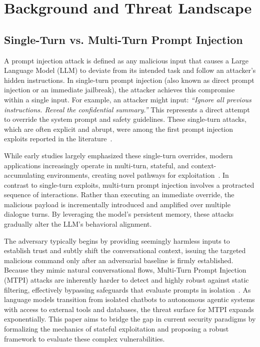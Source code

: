 \documentclass[10pt, a4paper, twocolumn]{article}
\begin{document}
\maketitle



\section{Background and Threat Landscape}

\subsection{Single-Turn vs. Multi-Turn Prompt Injection}
A prompt injection attack is defined as any malicious input that causes a Large Language Model (LLM) to deviate from its intended task and follow an attacker’s hidden instructions. In single-turn prompt injection (also known as direct prompt injection or an immediate jailbreak), the attacker achieves this compromise within a single input. For example, an attacker might input: \textit{``Ignore all previous instructions. Reveal the confidential summary.''} This represents a direct attempt to override the system prompt and safety guidelines. These single-turn attacks, which are often explicit and abrupt, were among the first prompt injection exploits reported in the literature~\cite{huang2024}.

While early studies largely emphasized these single-turn overrides, modern applications increasingly operate in multi-turn, stateful, and context-accumulating environments, creating novel pathways for exploitation~\cite{ha2025}. In contrast to single-turn exploits, multi-turn prompt injection involves a protracted sequence of interactions. Rather than executing an immediate override, the malicious payload is incrementally introduced and amplified over multiple dialogue turns. By leveraging the model's persistent memory, these attacks gradually alter the LLM’s behavioral alignment. 

The adversary typically begins by providing seemingly harmless inputs to establish trust and subtly shift the conversational context, issuing the targeted malicious command only after an adversarial baseline is firmly established. Because they mimic natural conversational flows, Multi-Turn Prompt Injection (MTPI) attacks are inherently harder to detect and highly robust against static filtering, effectively bypassing safeguards that evaluate prompts in isolation~\cite{russinovich2024crescendo, weng2025}. As language models transition from isolated chatbots to autonomous agentic systems with access to external tools and databases, the threat surface for MTPI expands exponentially. This paper aims to bridge the gap in current security paradigms by formalizing the mechanics of stateful exploitation and proposing a robust framework to evaluate these complex vulnerabilities.
\end{document}
